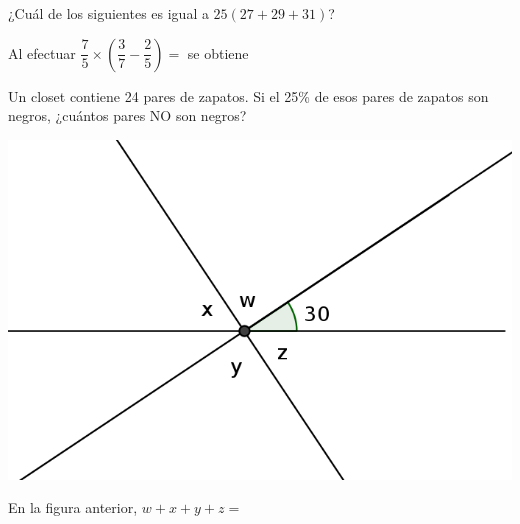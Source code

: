 \documentclass[letterpaper,10pt]{examdesign}
\begin{document}
\begin{multiplechoice}[rearrange=no,keycolumns=4,examcolumns=2]
\begin{block}
\begin{question}
\end{question}
\end{block}
\begin{question}
¿Cuál de los siguientes es igual a $25(27+29+31)$?
\end{question}
\begin{question}
Al efectuar $\dfrac{7}{5}\times \left(\dfrac{3}{7}-\dfrac{2}{5}\right)=$ \; se obtiene
\end{question}
\begin{question}
Un closet contiene 24 pares de zapatos. Si el 25\% de esos pares de zapatos son negros, ¿cuántos pares NO son negros?
\end{question}
\begin{block}
\includegraphics[scale=1.1]{Images/anguloswxyz.png} 
\begin{question}
En la figura anterior, $w+x+y+z=$
\end{question}
\end{block}
\begin{block}

\end{block}
\end{multiplechoice}
\end{document}

